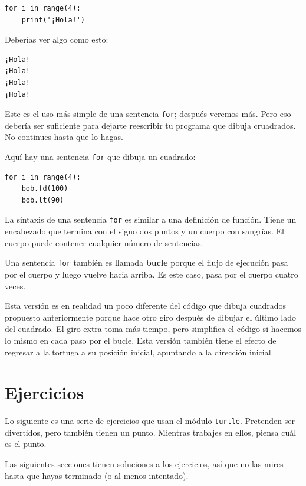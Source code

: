 \documentclass[10pt]{book}
\begin{document}
\begin{verbatim}
for i in range(4):
    print('¡Hola!')
\end{verbatim}
%
Deberías ver algo como esto:

\begin{verbatim}
¡Hola!
¡Hola!
¡Hola!
¡Hola!
\end{verbatim}
%
Este es el uso más simple de una sentencia {\tt for}; después veremos
más.  Pero eso debería ser suficiente para dejarte reescribir tu
programa que dibuja cruadrados.  No continues hasta que lo hagas.

Aquí hay una sentencia {\tt for} que dibuja un cuadrado:

\begin{verbatim}
for i in range(4):
    bob.fd(100)
    bob.lt(90)
\end{verbatim}
%
La sintaxis de una sentencia {\tt for} es similar a una definición
de función.  Tiene un encabezado que termina con el signo dos puntos y un cuerpo
con sangrías.  El cuerpo puede contener cualquier número de sentencias.

Una sentencia {\tt for} también es llamada {\bf bucle} porque
el flujo de ejecución pasa por el cuerpo y luego vuelve
hacia arriba.  Es este caso, pasa por el cuerpo cuatro veces.

Esta versión es en realidad un poco diferente del código
que dibuja cuadrados propuesto anteriormente porque hace otro giro después
de dibujar el último lado del cuadrado.  El giro extra toma
más tiempo, pero simplifica el código si hacemos lo mismo
en cada paso por el bucle.  Esta versión también tiene el efecto
de regresar a la tortuga a su posición inicial, apuntando a
la dirección inicial.

\section{Ejercicios}

Lo siguiente es una serie de ejercicios que usan el módulo {\tt turtle}.  Pretenden
ser divertidos, pero también tienen un punto.  Mientras trabajes en
ellos, piensa cuál es el punto.

Las siguientes secciones tienen soluciones a los ejercicios, así que
no las mires hasta que hayas terminado (o al menos intentado).
\end{document}
